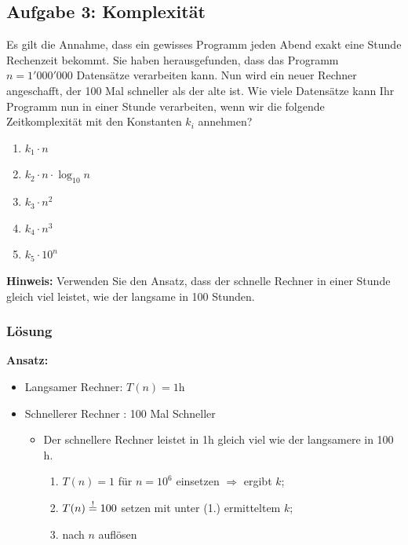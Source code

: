 \begin{multicols}{2}
\subsection{Aufgabe 3: Komplexität}
Es gilt die Annahme, dass ein gewisses Programm jeden Abend exakt eine Stunde Rechenzeit bekommt.
Sie haben herausgefunden, dass das Programm $n=1'000'000$ Datensätze verarbeiten kann. Nun wird ein
neuer Rechner angeschafft, der 100 Mal schneller als der alte ist.
Wie viele Datensätze kann Ihr Programm nun in einer Stunde verarbeiten, wenn wir die folgende Zeitkomplexität mit den Konstanten $k_i$ annehmen?

\begin{enumerate}
  \item $k_1 \cdot n$
  \item $k_2 \cdot n \cdot \log_{10} n$
  \item $k_3 \cdot n^2$
  \item $k_4 \cdot n^3$
  \item $k_5 \cdot 10^n$
\end{enumerate}

\textbf{Hinweis:}
Verwenden Sie den Ansatz, dass der schnelle Rechner in einer Stunde gleich viel leistet, wie der
langsame in 100 Stunden.

\subsubsection{Lösung}


\textbf{Ansatz:}

\begin{itemize}
  \item Langsamer Rechner: $T(n) = 1 \text{h}$
  \item Schnellerer Rechner : 100 Mal Schneller
  \begin{itemize}
    \item Der schnellere Rechner leistet in 1h gleich viel wie der langsamere in 100 h.
    \begin{enumerate}
      \item $T(n) = 1$ für $n= 10^6$ einsetzen $\Rightarrow$ ergibt $k$;
      \item $T(n)\mathrel{\stackon[1pt]{$=$}{$\scriptstyle!$}} 100 $ setzen mit unter (1.) ermitteltem $k$;
      \item nach $n$ auflösen
        \end{enumerate}
  \end{itemize}
\end{itemize}


\end{multicols}
